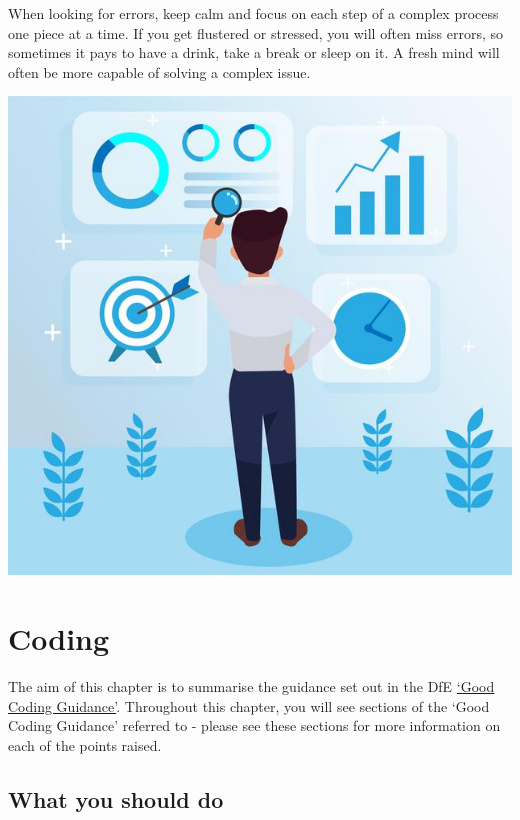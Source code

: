 \documentclass[
]{article}
\begin{document}
When looking for errors, keep calm and focus on each step of a complex process one piece at a time. If you get flustered or stressed, you will often miss errors, so sometimes it pays to have a drink, take a break or sleep on it. A fresh mind will often be more capable of solving a complex issue.

\includegraphics{pictures/work_pic.jpg}

\hypertarget{coding}{%
\section{Coding}\label{coding}}

The aim of this chapter is to summarise the guidance set out in the DfE \href{https://dfe-analytical-services.github.io/good-code-practice/}{`Good Coding Guidance'}. Throughout this chapter, you will see sections of the `Good Coding Guidance' referred to - please see these sections for more information on each of the points raised.

\hypertarget{what-you-should-do}{%
\subsection{\texorpdfstring{What you \textbf{should} do}{What you should do}}\label{what-you-should-do}}
\end{document}
